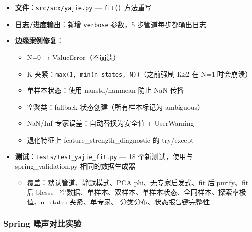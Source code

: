 \documentclass[
  12pt,
]{ctexart}
\providecommand{\tightlist}{%
  \setlength{\itemsep}{0pt}\setlength{\parskip}{0pt}}
\begin{document}
\begin{itemize}
\tightlist
\item
  \textbf{文件}：\texttt{src/scx/yajie.py} --- \texttt{fit()} 方法重写
\item
  \textbf{日志/进度输出}：新增 \texttt{verbose} 参数，5
  步管道每步都输出日志
\item
  \textbf{边缘案例修复}：

  \begin{itemize}
  \tightlist
  \item
    N=0 → ValueError（不崩溃）
  \item
    K 夹紧：\texttt{max(1,\ min(n\_states,\ N))}（之前强制 K≥2 在 N=1
    时会崩溃）
  \item
    单样本状态：使用 nanstd/nanmean 防止 NaN 传播
  \item
    空聚类：fallback 状态创建（所有样本标记为 ambiguous）
  \item
    NaN/Inf 专家误差：自动替换为安全值 + UserWarning
  \item
    退化特征上 feature\_strength\_diagnostic 的 try/except
  \end{itemize}
\item
  \textbf{测试}：\texttt{tests/test\_yajie\_fit.py} --- 18
  个新测试，使用与 spring\_validation.py 相同的数据生成器

  \begin{itemize}
  \tightlist
  \item
    覆盖：默认管道、静默模式、PCA phi、无专家启发式、fit 后 purify、fit
    后 bless、
    空数据、单样本、双样本、单样本状态、全同样本、探索率极值、n\_states
    夹紧、单专家、 分类分布、状态报告键完整性
  \end{itemize}
\end{itemize}

\subsubsection{Spring
噪声对比实验}\label{spring-ux566aux58f0ux5bf9ux6bd4ux5b9eux9a8c}
\end{document}
